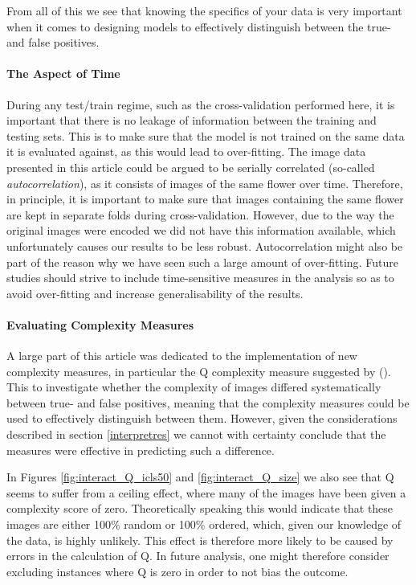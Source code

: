 \documentclass[12pt]{article}
\begin{document}
From all of this we see that knowing the specifics of your data is very important when it comes to designing models to effectively distinguish between the true- and false positives.

\paragraph{The Aspect of Time}
During any test/train regime, such as the cross-validation performed here, it is important that there is no leakage of information between the training and testing sets. This is to make sure that the model is not trained on the same data it is evaluated against, as this would lead to over-fitting. The image data presented in this article could be argued to be serially correlated (so-called \textit{autocorrelation}), as it consists of images of the same flower over time. Therefore, in principle, it is important to make sure that images containing the same flower are kept in separate folds during cross-validation. However, due to the way the original images were encoded we did not have this information available, which unfortunately causes our results to be less robust. Autocorrelation might also be part of the reason why we have seen such a large amount of over-fitting. Future studies should strive to include time-sensitive measures in the analysis so as to avoid over-fitting and increase generalisability of the results.

\paragraph{Evaluating Complexity Measures}
A large part of this article was dedicated to the implementation of new complexity measures, in particular the Q complexity measure suggested by (\cite{zanetteQuantifyingComplexityBlackandwhite2018}). This to investigate whether the complexity of images differed systematically between true- and false positives, meaning that the complexity measures could be used to effectively distinguish between them. However, given the considerations described in section \ref{interpretres} we cannot with certainty conclude that the measures were effective in predicting such a difference.

In Figures \ref{fig:interact_Q_icls50} and \ref{fig:interact_Q_size} we also see that Q seems to suffer from a ceiling effect, where many of the images have been given a complexity score of zero. Theoretically speaking this would indicate that these images are either 100\% random or 100\% ordered, which, given our knowledge of the data, is highly unlikely. This effect is therefore more likely to be caused by errors in the calculation of Q. In future analysis, one might therefore consider excluding instances where Q is zero in order to not bias the outcome.
\end{document}
